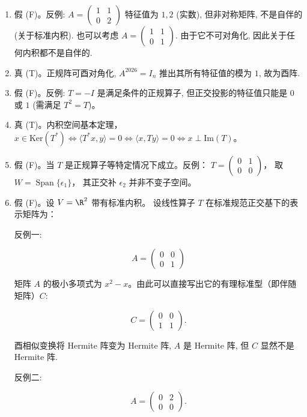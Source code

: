 \begin{enumerate}
特征多项式都是 \(x^{4}\)，极小多项式都是 \(x^{2}\)。
但不相似 (Jordan 标准型唯一性/有理标准型唯一性/秩不同).
\item
  假 (F)。反例: \(A = \begin{pmatrix} 1 & 1 \\ 0 & 2 \end{pmatrix}\)
  特征值为 $1, 2$ (实数), 但非对称矩阵, 不是自伴的 (关于标准内积).
  也可以考虑 \(A = \begin{pmatrix} 1 & 1 \\ 0 & 1 \end{pmatrix}\).
  由于它不可对角化, 因此关于任何内积都不是自伴的.
\item
  真 (T)。正规阵可酉对角化, \(A^{2026} = I_{n}\) 推出其所有特征值的模为 $1$, 故为酉阵.
\item
  假 (F)。反例: \(T = -I\) 是满足条件的正规算子,
  但正交投影的特征值只能是 $0$ 或 $1$ (需满足 \(T^2 = T\))。
\item
  真 (T)。内积空间基本定理，
  \(x \in \mathrm{Ker}(T^{*}) \iff \langle T^{*}x, y \rangle = 0 \iff \langle x, Ty \rangle = 0 \iff x \perp \mathrm{Im}(T)\)。
\item
  假 (F)。当 $T$ 是正规算子等特定情况下成立。反例：
  \(T = \begin{pmatrix} 0 & 1 \\ 0 & 0 \end{pmatrix}\)，
  取 \(W = \operatorname{Span}\{\epsilon_{1}\}\)，
  其正交补 \(\epsilon_{2}\) 并非不变子空间。
\item
  假 (F)。设 \(V = \R^{2}\) 带有标准内积。
  设线性算子 $T$ 在标准规范正交基下的表示矩阵为：

反例一:

\[A = \begin{pmatrix} 0 & 0 \\ 0 & 1 \end{pmatrix}\]

矩阵 $A$ 的极小多项式为 \(x^{2}-x\)。由此可以直接写出它的有理标准型（即伴随矩阵）$C$:

\[C = \begin{pmatrix} 0 & 0 \\ 1 & 1 \end{pmatrix}.\]

酉相似变换将 Hermite 阵变为 Hermite 阵, \(A\) 是 Hermite 阵, 
但 \(C\) 显然不是 Hermite 阵.

反例二:

\[A = \begin{pmatrix} 0 & 2 \\ 0 & 0 \end{pmatrix}.\]


\end{enumerate}

